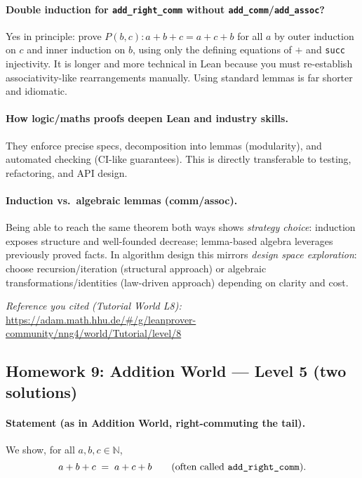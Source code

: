 \documentclass{article}
\theoremstyle{theorem}
\theoremstyle{definition}
\theoremstyle{remark}
\begin{document}
\paragraph{Double induction for \texttt{add\_right\_comm} without \texttt{add\_comm}/\texttt{add\_assoc}?}
Yes in principle: prove $P(b,c): a+b+c=a+c+b$ for all $a$ by outer induction on $c$ and inner induction on $b$, using only the defining equations of $+$ and \texttt{succ} injectivity. It is longer and more technical in Lean because you must re-establish associativity-like rearrangements manually. Using standard lemmas is far shorter and idiomatic.

\paragraph{How logic/maths proofs deepen Lean and industry skills.}
They enforce precise specs, decomposition into lemmas (modularity), and automated checking (CI-like guarantees). This is directly transferable to testing, refactoring, and API design.

\paragraph{Induction vs.\ algebraic lemmas (comm/assoc).}
Being able to reach the same theorem both ways shows \emph{strategy choice}: induction exposes structure and well-founded decrease; lemma-based algebra leverages previously proved facts. In algorithm design this mirrors \emph{design space exploration}: choose recursion/iteration (structural approach) or algebraic transformations/identities (law-driven approach) depending on clarity and cost.

\medskip

\noindent\textit{Reference you cited (Tutorial World L8):} \url{https://adam.math.hhu.de/#/g/leanprover-community/nng4/world/Tutorial/level/8}

\subsection{Homework 9: Addition World — Level 5 (two solutions)}

\paragraph{Statement (as in Addition World, right-commuting the tail).}
We show, for all $a,b,c\in\mathbb{N}$,
\[
a + b + c \;=\; a + c + b\qquad\text{(often called \texttt{add\_right\_comm}).}
\]
\end{document}
